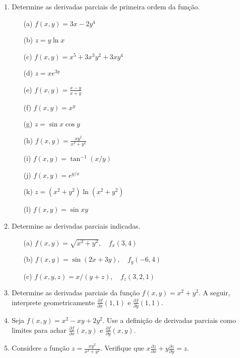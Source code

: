 \begin{enumerate}
    \item Determine as derivadas parciais de primeira ordem da função.
        \begin{multicols}{2}
            \begin{enumerate}
                \item[(a)] $f(x,y) = 3x - 2y^4$
                \item[(b)] $z = y \ln x$
                \item[(c)] $f(x,y) = x^5 + 3x^3y^2 + 3xy^4$
                \item[(d)] $z = xe^{3y}$
                \item[(e)] $f(x,y) = \frac{x-y}{x+y}$
                \item[(f)] $f(x,y) = x^y$
                \item[(g)] $z = \sin x \cos y$
                \item[(h)] $f(x,y) = \frac{xy^2}{x^2+y^2}$
                \item[(i)] $f(x,y) = \tan^{-1}(x/y)$
                \item[(j)] $f(x,y) = e^{y/x}$
                \item[(k)] $z = (x^2+y^2)\ln(x^2+y^2)$                \item[(l)] $f(x,y) = \sin xy$
            \end{enumerate}
        \end{multicols}
    \item Determine as derivadas parciais indicadas.
        \begin{enumerate}
            \item[(a)] $f(x,y) = \sqrt{x^2+y^2}, \quad f_x(3,4)$            
            \item[(b)] $f(x,y) = \sin(2x+3y), \quad f_y(-6,4)$            
            \item[(c)] $f(x,y,z) = x/(y+z), \quad f_z(3,2,1)$
        \end{enumerate}
    \item Determine as derivadas parciais da função $f(x,y) = x^2+y^2$. A seguir, interprete geometricamente $\frac{\partial f}{\partial x}(1,1)$ e $\frac{\partial f}{\partial y}(1,1)$.
    \item Seja $f(x,y) = x^2 - xy + 2y^2$. Use a definição de derivadas parciais como limites para achar $\frac{\partial f}{\partial x}(x,y)$ e $\frac{\partial f}{\partial y}(x,y)$.
    \item Considere a função $z = \frac{xy^2}{x^2+y^2}$. Verifique que $x\frac{\partial z}{\partial x} + y\frac{\partial z}{\partial y} = z$.

\end{enumerate}
